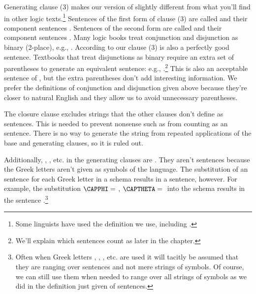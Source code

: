 Generating clause (3) makes our version of \GSL{} slightly different from what you'll find in other logic texts.\footnote{Some linguists have used the definition we use, including \citealt{Gleitman1965}.} 
Sentences of the first form of clause (3) are called  and their component sentences . Sentences of the second form are called  and their component sentences . 
Many logic books treat conjunction and disjunction as binary (2-place), e.g., \mention{$\pardisjunction{\Al}{\Bl}$}. According to our clause (3) \mention{$\pardisjunction{\disjunction{\Al}{\Bl}}{\Cl}$} is also a perfectly good sentence. Textbooks that treat disjunctions as binary require an extra set of parentheses to generate an equivalent sentence: e.g., \mention{$\pardisjunction{\pardisjunction{\Al}{\Bl}}{\Cl}$}.\footnote{We'll explain which sentences count as  later in the chapter.} This is also an acceptable sentence of \GSL{}, but the extra parentheses don't add interesting information. We prefer the definitions of conjunction and disjunction given above because they're closer to natural English and they allow us to avoid unnecessary parentheses.

The closure clause excludes strings that the other clauses don't define as sentences. 
This is needed to prevent nonsense such as \mention{$(\Bl(\HORSESHOE{}\Al$} from counting as an \GSL{} sentence. 
There is no way to generate the string from repeated applications of the base and generating clauses, so it is ruled out. 

Additionally, \mention{$\negation{\CAPPHI}$}, \mention{$\parhorseshoe{\CAPPHI}{\CAPTHETA}$}, etc. in the generating clauses are . 
They aren't \GSL{} sentences because the Greek letters aren't given as symbols of the language. 
The substitution of an \GSL{} sentence for each Greek letter in a schema results in a \GSL{} sentence, however. 
For example, the substitution $\CAPPHI=\;$\mention{$\Al$}, $\CAPTHETA=\;$\mention{$\partriplebar{\Cl}{\Dl}$} into the schema \mention{$\parhorseshoe{\CAPPHI}{\CAPTHETA}$} results in the sentence \mention{$\parhorseshoe{\Al}{\partriplebar{\Cl}{\Dl}}$}.\footnote{Often when Greek letters \mention{$\CAPPHI$}, \mention{$\CAPPSI$}, \mention{$\CAPTHETA$}, etc. are used it will tacitly be assumed that they are ranging over \GSL{} sentences and not mere strings of \GSL{} symbols. 
Of course, we can still use them when needed to range over all strings of \GSL{} symbols as we did in the definition just given of \GSL{} sentences.}

